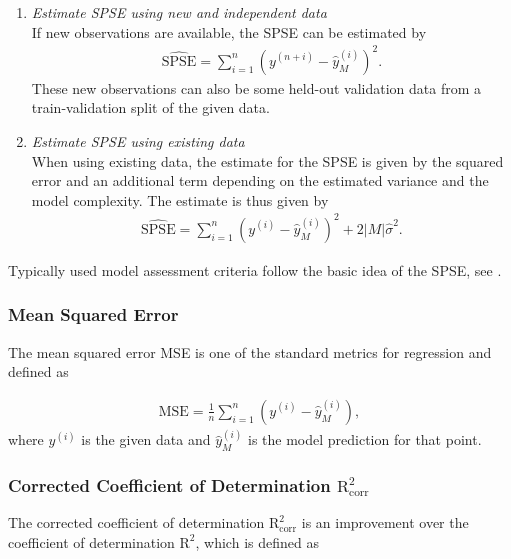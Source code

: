 \begin{enumerate}

	\item \emph{Estimate SPSE using new and independent data} \\	
	If new observations are available, the SPSE can be estimated by
	\begin{align}
		\widehat{\text{SPSE}} = \sum_{i=1}^n \left(y^{(n+i)} - \hat y^{(i)}_M\right)^2.
	\end{align}
	These new observations can also be some held-out validation data from a train-validation split of the given data. 
	
	\item \emph{Estimate SPSE using existing data} \\
	When using existing data, the estimate for the SPSE is given by the squared error and an additional  term depending on the estimated variance and the model complexity. The estimate is thus given by
	\begin{align}
		\widehat{\text{SPSE}} = \sum_{i=1}^n \left(y^{(i)} - \hat y^{(i)}_M\right)^2 + 2\vert M \vert \hat \sigma^2.
	\end{align}

\end{enumerate}

Typically used model assessment criteria follow the basic idea of the SPSE, see \cite{fahrmeir2007regression}.

\subsubsection{Mean Squared Error} 

The mean squared error MSE is one of the standard metrics for regression and defined as

\begin{align} \label{eq:MSE-DEF}
	\mathrm{MSE} = \frac{1}{n} \sum_{i=1}^n \left(y^{(i)} - \hat y^{(i)}_M \right),	
\end{align}
%
where $y^{(i)}$ is the given data and $\hat y^{(i)}_M$ is the model prediction for that point. 

\subsubsection{Corrected Coefficient of Determination $\text{R}_{\mathrm{corr}}^2$}

The corrected coefficient of determination $\text{R}^2_{\mathrm{corr}}$ is an improvement over the coefficient of determination $\text{R}^2$, which is defined as 

